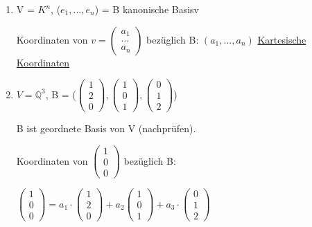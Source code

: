 \documentclass[a4paper, openany]{book}
\begin{document}
    \begin{enumerate}[label=(\alph*)]
      \item V = $K^n$, ($e_1, ..., e_n$) = B kanonische Basisv 

      Koordinaten von $v = \begin{pmatrix}a_1 \\ ... \\ a_n \end{pmatrix}$ bezüglich B: $(a_1, ..., a_n)$ \underline{Kartesische Koordinaten}

      \item $V = \mathbb{Q}^3$, B = ($\begin{pmatrix}1 \\ 2 \\ 0 \end{pmatrix}, \begin{pmatrix}1 \\ 0 \\ 1 \end{pmatrix}, \begin{pmatrix}0 \\ 1 \\ 2 \end{pmatrix}$)

      B ist geordnete Basis von V (nachprüfen).

      \par \medskip

      Koordinaten von $\begin{pmatrix}1 \\ 0 \\ 0 \end{pmatrix}$ bezüglich B: 

      $\begin{pmatrix}1 \\ 0 \\ 0 \end{pmatrix} = a_1 \cdot \begin{pmatrix}1 \\ 2 \\ 0 \end{pmatrix} + a_2 \begin{pmatrix}1 \\ 0 \\ 1 \end{pmatrix} + a_3 \cdot \begin{pmatrix}0 \\ 1 \\ 2 \end{pmatrix}$


\end{enumerate}
\end{document}
